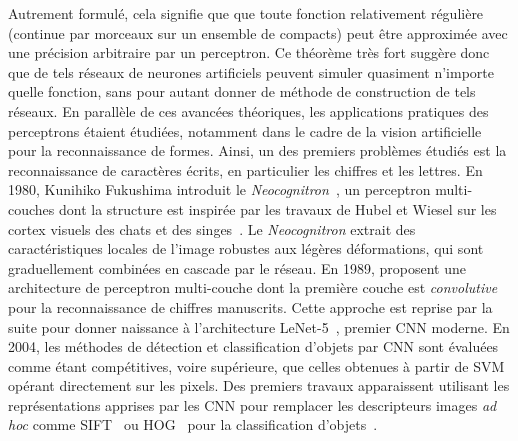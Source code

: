 Autrement formulé, cela signifie que que toute fonction relativement régulière (continue par morceaux sur un ensemble de compacts) peut être approximée avec une précision arbitraire par un perceptron. Ce théorème très fort suggère donc que de tels réseaux de neurones artificiels peuvent simuler quasiment n'importe quelle fonction, sans pour autant donner de méthode de construction de tels réseaux. En parallèle de ces avancées théoriques, les applications pratiques des perceptrons étaient étudiées, notamment dans le cadre de la vision artificielle pour la reconnaissance de formes. Ainsi, un des premiers problèmes étudiés est la reconnaissance de caractères écrits, en particulier les chiffres et les lettres. En 1980, Kunihiko Fukushima introduit le \emph{Neocognitron}~\cite{fukushima_neocognitron_1980}, un perceptron multi-couches dont la structure est inspirée par les travaux de Hubel et Wiesel sur les cortex visuels des chats et des singes~\cite{hubel_receptive_1959,hubel_receptive_1968}. Le \emph{Neocognitron} extrait des caractéristiques locales de l'image robustes aux légères déformations, qui sont graduellement combinées en cascade par le réseau. En 1989, \citet{lecun_backpropagation_1989} proposent une architecture de perceptron multi-couche dont la première couche est \emph{convolutive} pour la reconnaissance de chiffres manuscrits. Cette approche est reprise par la suite pour donner naissance à l'architecture LeNet-5~\cite{lecun_gradient-based_1998}, premier \gls{CNN} moderne. En 2004, les méthodes de détection et classification d'objets par \gls{CNN} sont évaluées comme étant compétitives, voire supérieure, que celles obtenues à partir de \gls{SVM} opérant directement sur les pixels. Des premiers travaux apparaissent utilisant les représentations apprises par les \gls{CNN} pour remplacer les descripteurs images \emph{ad hoc} comme \gls{SIFT}~\cite{lowe_object_1999} ou \gls{HOG}~\cite{dalal_histograms_2005} pour la classification d'objets~\cite{serre_object_2005,huang_large-scale_2006}.

